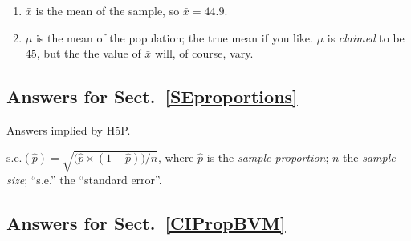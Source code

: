 \documentclass[
  11pt,
  a4paper,
  krantz2]{krantz}
\begin{document}
\begin{footnotesize}
\begin{enumerate}
  If we had many, many sets of \(25\)~matches boxes,
  \(95\)\% of these sets of~\(25\) would have a mean between \(44.85\) and \(44.95\).
\item
  \(\bar{x}\) is the mean of the sample, so \(\bar{x} = 44.9\).
\item
  \(\mu\) is the mean of the population; the true mean if you like.
  \(\mu\) is \emph{claimed} to be \(45\), but the the value of \(\bar{x}\) will, of course, vary.
\end{enumerate}

\subsection*{Answers for Sect.~\ref{SEproportions}}\label{answers-for-sect.-refseproportions}

Answers implied by H5P.

\(\displaystyle \text{s.e.}(\hat{p}) = \sqrt{ \big(\hat{p}\times(1 - \hat{p}) \big)/n}\), where \(\hat{p}\) is the \emph{sample proportion}; \(n\) the \emph{sample size}; ``s.e.'' the ``standard error''.

\subsection*{Answers for Sect.~\ref{CIPropBVM}}\label{answers-for-sect.-refcipropbvm}


\end{footnotesize}
\end{document}
